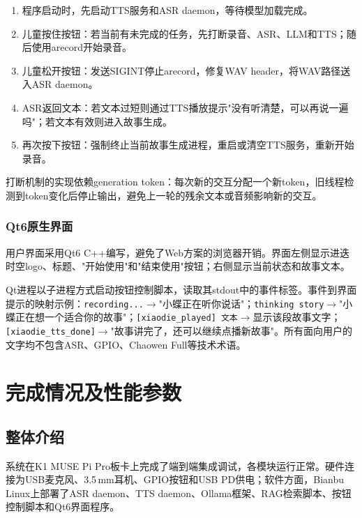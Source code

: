 \documentclass[lettersize,journal]{IEEEtran}
\begin{document}
\begin{enumerate}[leftmargin=*]
    \item 程序启动时，先启动TTS服务和ASR daemon，等待模型加载完成。
    \item 儿童按住按钮：若当前有未完成的任务，先打断录音、ASR、LLM和TTS；随后使用arecord开始录音。
    \item 儿童松开按钮：发送SIGINT停止arecord，修复WAV header，将WAV路径送入ASR daemon。
    \item ASR返回文本：若文本过短则通过TTS播放提示"没有听清楚，可以再说一遍吗"；若文本有效则进入故事生成。
    \item 再次按下按钮：强制终止当前故事生成进程，重启或清空TTS服务，重新开始录音。
\end{enumerate}

打断机制的实现依赖generation token：每次新的交互分配一个新token，旧线程检测到token变化后停止输出，避免上一轮的残余文本或音频影响新的交互。

\subsubsection{Qt6原生界面}

用户界面采用Qt6 C++编写，避免了Web方案的浏览器开销。界面左侧显示进迭时空logo、标题、"开始使用"和"结束使用"按钮；右侧显示当前状态和故事文本。

Qt进程以子进程方式启动按钮控制脚本，读取其stdout中的事件标签。事件到界面提示的映射示例：\texttt{recording...}$\rightarrow$"小蝶正在听你说话"；\texttt{thinking story}$\rightarrow$"小蝶正在想一个适合你的故事"；\texttt{[xiaodie\_played] 文本}$\rightarrow$显示该段故事文字；\texttt{[xiaodie\_tts\_done]}$\rightarrow$"故事讲完了，还可以继续点播新故事"。所有面向用户的文字均不包含ASR、GPIO、Chaowen Full等技术术语。

\section{完成情况及性能参数}
\label{sec:results}

\subsection{整体介绍}

系统在K1 MUSE Pi Pro板卡上完成了端到端集成调试，各模块运行正常。硬件连接为USB麦克风、3.5\,mm耳机、GPIO按钮和USB PD供电；软件方面，Bianbu Linux上部署了ASR daemon、TTS daemon、Ollama框架、RAG检索脚本、按钮控制脚本和Qt6界面程序。
\end{document}
